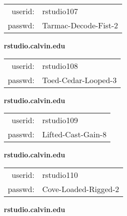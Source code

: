 \documentclass{article}\usepackage[]{graphicx}\usepackage[]{color}
\begin{document}
\begin{multicols}{3}
\begin{minipage}{.3\textwidth}
\begin{tabular}{rl}
userid: & rstudio107\\
passwd: & Tarmac-Decode-Fist-2

\vspace{5mm}

\end{tabular}\end{minipage}

\vspace{5mm}

\begin{minipage}{.3\textwidth}
\centerline{\textbf{rstudio.calvin.edu}}
\medskip
\begin{tabular}{rl}

userid: & rstudio108\\
passwd: & Toed-Cedar-Looped-3

\vspace{5mm}

\end{tabular}\end{minipage}

\vspace{5mm}

\begin{minipage}{.3\textwidth}
\centerline{\textbf{rstudio.calvin.edu}}
\medskip
\begin{tabular}{rl}

userid: & rstudio109\\
passwd: & Lifted-Cast-Gain-8

\vspace{5mm}

\end{tabular}\end{minipage}

\vspace{5mm}

\begin{minipage}{.3\textwidth}
\centerline{\textbf{rstudio.calvin.edu}}
\medskip
\begin{tabular}{rl}

userid: & rstudio110\\
passwd: & Cove-Loaded-Rigged-2

\vspace{5mm}

\end{tabular}\end{minipage}

\vspace{5mm}

\begin{minipage}{.3\textwidth}
\centerline{\textbf{rstudio.calvin.edu}}
\medskip
\begin{tabular}{rl}


\end{tabular}
\end{minipage}
\end{multicols}
\end{document}
